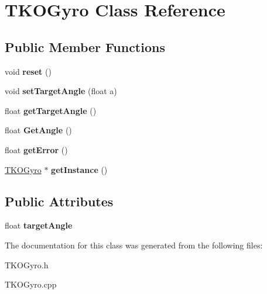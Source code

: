 \hypertarget{classTKOGyro}{\section{\-T\-K\-O\-Gyro \-Class \-Reference}
\label{classTKOGyro}
}
\subsection*{\-Public \-Member \-Functions}
\begin{DoxyCompactItemize}
\item 
\hypertarget{classTKOGyro_a4e6c3951b30065d91e89fd35108403fb}{void {\bfseries reset} ()}\label{classTKOGyro_a4e6c3951b30065d91e89fd35108403fb}

\item 
\hypertarget{classTKOGyro_a40eec78ad84544094208bbb06e2c3cb6}{void {\bfseries set\-Target\-Angle} (float a)}\label{classTKOGyro_a40eec78ad84544094208bbb06e2c3cb6}

\item 
\hypertarget{classTKOGyro_a9b1dc401b17b9b027ebd1676b035c38c}{float {\bfseries get\-Target\-Angle} ()}\label{classTKOGyro_a9b1dc401b17b9b027ebd1676b035c38c}

\item 
\hypertarget{classTKOGyro_af2f5666e5f5d2402ecec2ac87613dc8c}{float {\bfseries \-Get\-Angle} ()}\label{classTKOGyro_af2f5666e5f5d2402ecec2ac87613dc8c}

\item 
\hypertarget{classTKOGyro_ac89122114696d0deb73709d9f39bbc2d}{float {\bfseries get\-Error} ()}\label{classTKOGyro_ac89122114696d0deb73709d9f39bbc2d}

\item 
\hypertarget{classTKOGyro_afa94af022d80b3e5e72387fad39a89a1}{\hyperlink{classTKOGyro}{\-T\-K\-O\-Gyro} $\ast$ {\bfseries get\-Instance} ()}\label{classTKOGyro_afa94af022d80b3e5e72387fad39a89a1}

\end{DoxyCompactItemize}
\subsection*{\-Public \-Attributes}
\begin{DoxyCompactItemize}
\item 
\hypertarget{classTKOGyro_af18840d84301e0aa6a6a8b88a14020b3}{float {\bfseries target\-Angle}}\label{classTKOGyro_af18840d84301e0aa6a6a8b88a14020b3}

\end{DoxyCompactItemize}


\-The documentation for this class was generated from the following files\-:\begin{DoxyCompactItemize}
\item 
\-T\-K\-O\-Gyro.\-h\item 
\-T\-K\-O\-Gyro.\-cpp\end{DoxyCompactItemize}

